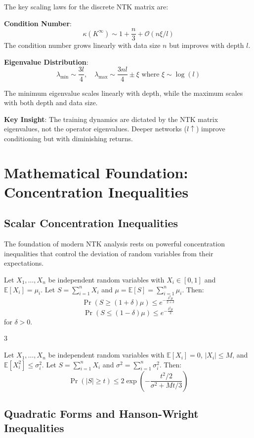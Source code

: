\documentclass[a4paper]{article}
\newcommand{\E}{\mathbb{E}}
\begin{document}
The key scaling laws for the discrete NTK matrix are:

\textbf{Condition Number}:
\[ \kappa(K^{\infty}) \sim 1 + \frac{n}{3} + \mathcal{O}(n \xi / l) \]
The condition number grows linearly with data size $n$ but improves with depth $l$.

\textbf{Eigenvalue Distribution}:
\[ \lambda_{\text{min}} \sim \frac{3l}{4}, \quad \lambda_{\text{max}} \sim \frac{3nl}{4} \pm \xi \text{ where } \xi \sim \log(l) \]

The minimum eigenvalue scales linearly with depth, while the maximum scales with both depth and data size.

\textbf{Key Insight}: The training dynamics are dictated by the NTK matrix eigenvalues, not the operator eigenvalues. Deeper networks ($l \uparrow$) improve conditioning but with diminishing returns.


\section{Mathematical Foundation: Concentration Inequalities}

\subsection{Scalar Concentration Inequalities}

The foundation of modern NTK analysis rests on powerful concentration inequalities that control the deviation of random variables from their expectations.

\begin{theorem}
Let $X_1, \ldots, X_n$ be independent random variables with $X_i \in [0,1]$ and $\E[X_i] = \mu_i$. Let $S = \sum_{i=1}^n X_i$ and $\mu = \E[S] = \sum_{i=1}^n \mu_i$. Then:
$$\Pr(S \geq (1+\delta)\mu) \leq e^{-\frac{\delta^2 \mu}{2+\delta}}$$
$$\Pr(S \leq (1-\delta)\mu) \leq e^{-\frac{\delta^2 \mu}{2}}$$
for $\delta > 0$.
\end{theorem}

3\begin{theorem}
Let $X_1, \ldots, X_n$ be independent random variables with $\E[X_i] = 0$, $|X_i| \leq M$, and $\E[X_i^2] \leq \sigma_i^2$. Let $S = \sum_{i=1}^n X_i$ and $\sigma^2 = \sum_{i=1}^n \sigma_i^2$. Then:
$$\Pr(|S| \geq t) \leq 2\exp\left(-\frac{t^2/2}{\sigma^2 + Mt/3}\right)$$
\end{theorem}

\subsection{Quadratic Forms and Hanson-Wright Inequalities}
\end{document}
